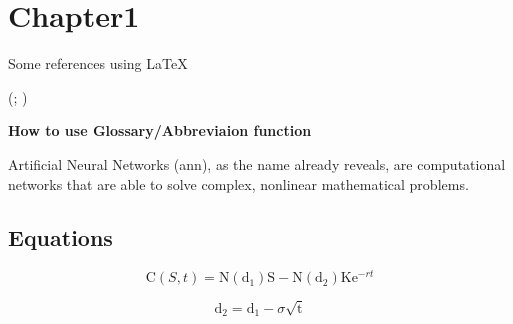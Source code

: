 \section{Chapter1}
	\label{sec:chapter1}

	Some references using \LaTeX

	\citet{de1998little}

	\citet[p.~34]{de1998little}

	\citep{de1998little}

	\citep[p.~34]{de1998little}

	\citep{de1998little,bieger2013}

	(\citealp[p.~3]{de1998little}; \citealp[p.~5]{bieger2013})

	\citep[e.g.][p.~34]{de1998little}

	\textbf{How to use Glossary/Abbreviaion function}

Artificial Neural Networks (\gls{ann}), as the name already reveals, are computational networks that are able to solve complex, nonlinear mathematical problems.

\subsection{Equations}
	\label{subsec:equ}


	\begin{equation}
	\mathrm C( S, t)= \mathrm N(\mathrm d_1)\mathrm S - \mathrm N(\mathrm d_2) \mathrm K \mathrm e^{-rt}
	\label{eq:1}
	\end{equation}

	\begin{equation}
	\mathrm d_2= \mathrm d_1 - \sigma \sqrt{\mathrm t}
	\label{eq:3}
	\end{equation}

	\newpage
